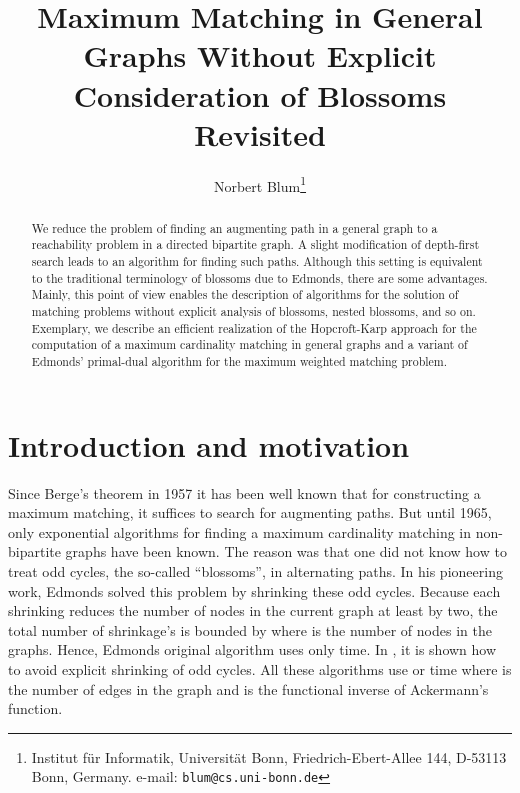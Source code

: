 \documentclass[12pt,twoside,a4paper]{article}
\title{Maximum Matching in General Graphs Without Explicit Consideration 
of Blossoms Revisited}
\author{Norbert Blum\thanks{Institut f\"ur Informatik, Universit\"at Bonn, Friedrich-Ebert-Allee 144, D-53113 Bonn, Germany.
    e-mail:{ \tt blum@cs.uni-bonn.de}}}
\begin{document}
\date{}
\maketitle
\begin{abstract}
\noindent 
We reduce the problem of finding an augmenting path in a general
graph to a reachability problem in a directed bipartite graph. 
A slight modification of depth-first search leads to an algorithm for 
finding such paths.
Although this setting is equivalent to the traditional terminology of 
blossoms due to Edmonds, there are some advantages. Mainly, 
this point of view enables the description of algorithms
for the solution of matching problems without explicit analysis of
blossoms, nested blossoms, and so on. Exemplary, we describe an efficient
realization of the Hopcroft-Karp approach for the computation of a 
maximum cardinality matching in general graphs and a variant of 
Edmonds' primal-dual algorithm for the maximum weighted matching problem.
\end{abstract}


\section{Introduction and motivation}

Since Berge's theorem in 1957 \cite{Be} it has been well known that
for constructing a maximum matching, it suffices to search for augmenting
paths. But until 1965, only exponential algorithms for finding a maximum 
cardinality matching in non-bipartite graphs have been known. The reason was that 
one did not know how to treat odd cycles, the so-called ``blossoms'', in 
alternating paths.
In his pioneering work, Edmonds \cite{Ed1} solved this problem by shrinking
these odd cycles. Because each shrinking reduces the number of nodes in the
current graph at least by two, the total number of shrinkage's is bounded by
 where  is the number of nodes in the graphs. Hence, Edmonds
original algorithm uses only  time.
In \cite{Bal,Gab,La,WZ}, it is shown how to avoid explicit
shrinking of odd cycles. All these algorithms use  or  
time where  is the number of edges in the graph and  is the functional 
inverse of Ackermann's function.
\end{document}
